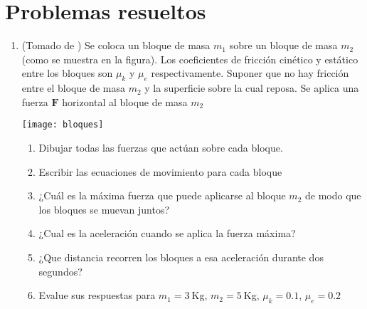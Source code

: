 \section{Problemas resueltos}

\begin{enumerate}
\item  (Tomado de \cite{gabriel}) Se coloca un bloque de masa $m_1$ sobre un bloque de masa $m_2$ (como se muestra en la figura). Los coeficientes de fricción cinético y estático entre los bloques son $\mu_k$ y $\mu_e$ respectivamente. Suponer que no hay fricción entre el bloque de masa $m_2$ y la superficie sobre la cual reposa. Se aplica una fuerza $\mathbf{F}$ horizontal al bloque de masa $m_2$

  \begin{minipage}{0.4\linewidth}
    \texttt{[image: bloques]}
  \end{minipage}
  \begin{minipage}{0.6\linewidth}
    \begin{enumerate}
    \item Dibujar todas las fuerzas que actúan sobre cada bloque.
      \label{item:d1a}
    \item Escribir las ecuaciones de movimiento para cada bloque
      \label{item:d1b}
    \item ¿Cuál es la máxima fuerza que puede aplicarse al bloque $m_2$ de modo que los bloques se muevan juntos?
      \label{item:d1c}
    \item ¿Cual es la aceleración cuando se aplica la fuerza máxima?
      \label{item:d1d}
    \item ¿Que distancia recorren los bloques a esa aceleración durante dos segundos?
      \label{item:d1e}
    \item Evalue sus respuestas para $m_1=3\ $Kg, $m_2=5\ $Kg, $\mu_k=0.1$, $\mu_e=0.2$
      \label{item:d1f}
    \end{enumerate}
  \end{minipage}


\end{enumerate}
